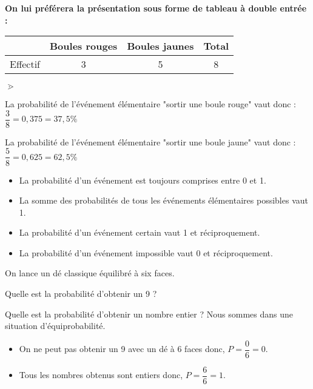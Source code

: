 \begin{exemples*1}
\begin{itemize}
        \bigskip
        \textbf{On lui préférera la présentation sous forme de tableau à double entrée :}
        
        \smallskip
        \begin{tabular}{|c|c|c|c|}
            \hline
            &Boules rouges&Boules jaunes&Total\\\hline
            Effectif&3&5&8\\\hline
        \end{tabular}
        \begin{list}{$\gtrdot$}{}
            \item La probabilité de l'événement élémentaire "sortir une boule rouge" vaut donc : \\$\dfrac38=0,375=37,5\%$
            \item La probabilité de l'événement élémentaire "sortir une boule jaune" vaut donc : \\$\dfrac58=0,625=62,5\%$
        \end{list}

        \smallskip
    \end{itemize}
\end{exemples*1}

\begin{propriete}
    \begin{itemize}
        \item La probabilité d'un événement est toujours comprises entre 0 et 1.
        \item La somme des probabilités de tous les événements élémentaires possibles vaut 1.
        \item La probabilité d'un événement certain vaut 1 et réciproquement.
        \item La probabilité d'un événement impossible vaut 0 et réciproquement.
    \end{itemize}
\end{propriete}

\begin{exemple*1}
    On lance un dé classique équilibré à six faces.
    
    Quelle est la probabilité d'obtenir un 9 ?
    
    Quelle est la probabilité d'obtenir un nombre entier ?
    \correction
    Nous sommes dans une situation d'équiprobabilité.
    \begin{itemize} 
        \item On ne peut pas obtenir un 9 avec un dé à 6 faces donc, $P =\dfrac06 =0$.
        \item Tous les nombres obtenus sont entiers donc, $P =\dfrac66 =1$.
    \end{itemize}
\end{exemple*1}
